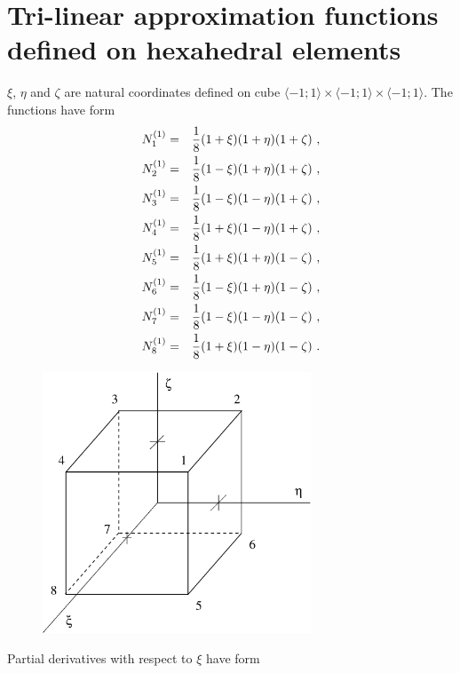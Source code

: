 \section{Tri-linear approximation functions defined on hexahedral elements}
$\xi$, $\eta$ and $\zeta$ are natural coordinates defined on cube
$\langle-1;1\rangle\times\langle-1;1\rangle\times\langle-1;1\rangle$. The functions have form
\begin{eqnarray}
\label{bflinhexn1}
N_1^{(1)} &=& \mbox{$\displaystyle\frac{1}{8}$} (1 + \xi) (1 + \eta) (1 + \zeta)\ ,
\\
\label{bflinhexn2}
N_2^{(1)} &=& \mbox{$\displaystyle\frac{1}{8}$} (1 - \xi) (1 + \eta) (1 + \zeta)\ ,
\\
\label{bflinhexn3}
N_3^{(1)} &=& \mbox{$\displaystyle\frac{1}{8}$} (1 - \xi) (1 - \eta) (1 + \zeta)\ ,
\\
\label{bflinhexn4}
N_4^{(1)} &=& \mbox{$\displaystyle\frac{1}{8}$} (1 + \xi) (1 - \eta) (1 + \zeta)\ ,
\\
\label{bflinhexn5}
N_5^{(1)} &=& \mbox{$\displaystyle\frac{1}{8}$} (1 + \xi) (1 + \eta) (1 - \zeta)\ ,
\\
\label{bflinhexn6}
N_6^{(1)} &=& \mbox{$\displaystyle\frac{1}{8}$} (1 - \xi) (1 + \eta) (1 - \zeta)\ ,
\\
\label{bflinhexn7}
N_7^{(1)} &=& \mbox{$\displaystyle\frac{1}{8}$} (1 - \xi) (1 - \eta) (1 - \zeta)\ ,
\\
\label{bflinhexn8}
N_8^{(1)} &=& \mbox{$\displaystyle\frac{1}{8}$} (1 + \xi) (1 - \eta) (1 - \zeta)\ .
\end{eqnarray}
\begin{figure}
\begin{center}
\includegraphics[width=80mm]{FIG/linhex.eps}
\end{center}
\end{figure}
Partial derivatives with respect to $\xi$ have form

